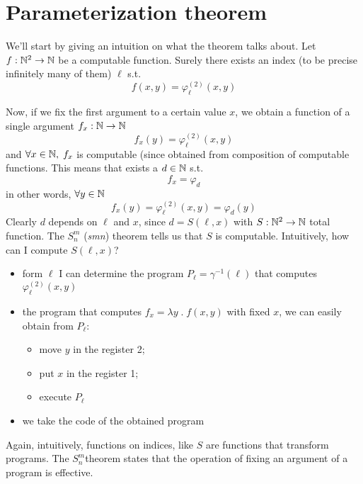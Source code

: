 \chapter {Parameterization theorem}
\newcommand{\smn}{$S_n^m$}

We'll start by giving an intuition on what the theorem talks
about. Let $f : \mathbb{N}^2 \rightarrow \mathbb{N}$ be a computable
function. Surely there exists an index (to be precise infinitely many
of them) $\ell$ s.t. \[f(x,y) = \varphi_\ell^{(2)}(x,y)\]

Now, if we fix the first argument to a certain value $x$, we obtain a
function of a single argument $f_x : \mathbb{N} \rightarrow \mathbb{N}$
\[f_x(y) = \varphi_\ell^{(2)}(x,y)\] and $\forall x \in \mathbb{N}, \; f_x$
is computable (since obtained from composition of computable
functions. This means that exists a $d \in \mathbb{N}$ s.t.
\[f_x = \varphi_d\] in other words, $\forall y \in \mathbb{N}$
\[f_x(y) = \varphi_\ell^{(2)}(x,y) = \varphi_d(y)\] Clearly $d$
depends on $\ell$ and $x$, since $d = S(\ell, x)$ with
$S : \mathbb{N}^2 \rightarrow \mathbb{N}$ total function. The \smn
(\textit{smn}) theorem tells us that $S$ is computable. Intuitively,
how can I compute $S(\ell, x)$?

\begin{itemize}
\item form $\ell$ I can determine the program
  $P_\ell = \gamma^{-1}(\ell)$ that computes $\varphi_\ell^{(2)}(x,y)$
\item the program that computes $f_x = \lambda y \; . \; f(x,y)$ with
  fixed $x$, we can easily obtain from $P_\ell$:
  \begin{itemize}
  \item move $y$ in the register 2;
  \item put $x$ in the register 1;
  \item execute $P_\ell$
  \end{itemize}
\item we take the code of the obtained program
\end{itemize}

Again, intuitively, functions on indices, like $S$ are functions that
transform programs. The \smn theorem states that the operation of
fixing an argument of a program is effective.

